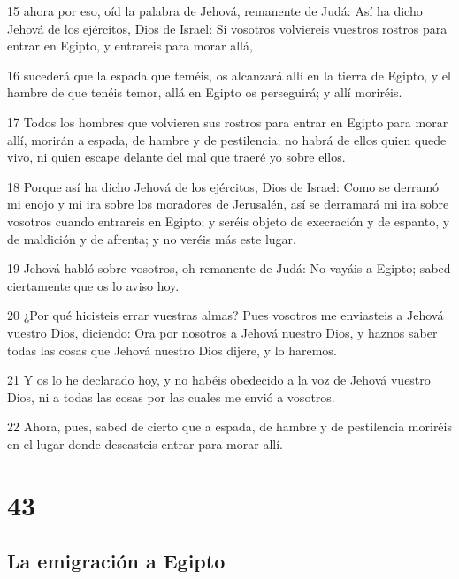 \par 15 ahora por eso, oíd la palabra de Jehová, remanente de Judá: Así ha dicho Jehová de los ejércitos, Dios de Israel: Si vosotros volviereis vuestros rostros para entrar en Egipto, y entrareis para morar allá,
\par 16 sucederá que la espada que teméis, os alcanzará allí en la tierra de Egipto, y el hambre de que tenéis temor, allá en Egipto os perseguirá; y allí moriréis.
\par 17 Todos los hombres que volvieren sus rostros para entrar en Egipto para morar allí, morirán a espada, de hambre y de pestilencia; no habrá de ellos quien quede vivo, ni quien escape delante del mal que traeré yo sobre ellos.
\par 18 Porque así ha dicho Jehová de los ejércitos, Dios de Israel: Como se derramó mi enojo y mi ira sobre los moradores de Jerusalén, así se derramará mi ira sobre vosotros cuando entrareis en Egipto; y seréis objeto de execración y de espanto, y de maldición y de afrenta; y no veréis más este lugar.
\par 19 Jehová habló sobre vosotros, oh remanente de Judá: No vayáis a Egipto; sabed ciertamente que os lo aviso hoy.
\par 20 ¿Por qué hicisteis errar vuestras almas? Pues vosotros me enviasteis a Jehová vuestro Dios, diciendo: Ora por nosotros a Jehová nuestro Dios, y haznos saber todas las cosas que Jehová nuestro Dios dijere, y lo haremos.
\par 21 Y os lo he declarado hoy, y no habéis obedecido a la voz de Jehová vuestro Dios, ni a todas las cosas por las cuales me envió a vosotros.
\par 22 Ahora, pues, sabed de cierto que a espada, de hambre y de pestilencia moriréis en el lugar donde deseasteis entrar para morar allí.

\chapter{43}

\section*{La emigración a Egipto}

